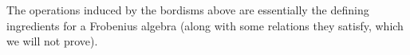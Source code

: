 \documentclass[psamsfonts, 11pt]{amsart}
\theoremstyle{definition}
\theoremstyle{remark}
\newcommand{\C}{\mathbb{C}}
\begin{document}
%
The operations induced by the bordisms above are essentially the defining ingredients
for a Frobenius algebra (along with some relations they satisfy, which we will
not prove).
\iffalse
An example of a Frobenius algebra is the group algebra $\C[G]$ for a
finite group $g$. The maps are as follows:
\begin{enumerate}
  \item The multiplication is the usual one in the group alebra.
  \item the comultiplication is the map $g \mapsto g \otimes g$.
  \item
\end{enumerate}
\fi
%
\end{document}
